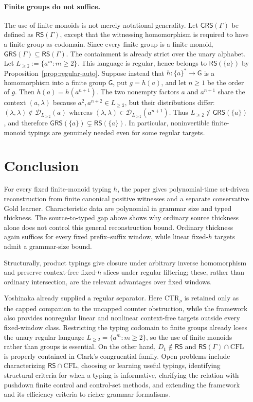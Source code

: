 \documentclass[11pt,a4paper]{article}
\theoremstyle{remark}
\theoremstyle{plain}
\newcommand{\D}{\mathcal{D}}
\begin{document}
\paragraph{Finite groups do not suffice.}
The use of finite monoids is not merely notational generality.  Let
$\mathsf{GRS}(\Gamma)$ be defined as $\mathsf{RS}(\Gamma)$, except that
the witnessing homomorphism is required to have a finite group as codomain.
Since every finite group is a finite monoid,
$\mathsf{GRS}(\Gamma)\subseteq\mathsf{RS}(\Gamma)$.
The containment is already strict over the unary alphabet.
Let
$L_{\ge2}:=\{a^m:m\ge2\}$.
This language is regular, hence belongs to $\mathsf{RS}(\{a\})$ by
Proposition~\ref{prop:regular-auto}.  Suppose instead that
$h:\{a\}^*\to\mathsf G$ is a homomorphism into a finite group
$\mathsf G$, put $g=h(a)$, and let $n\ge1$ be the order of $g$.  Then
$h(a)=h(a^{n+1})$.  The two nonempty factors $a$ and $a^{n+1}$ share the
context $(a,\lambda)$ because $a^2,a^{n+2}\in L_{\ge2}$, but their
distributions differ: $(\lambda,\lambda)\notin\D_{L_{\ge2}}(a)$ whereas
$(\lambda,\lambda)\in\D_{L_{\ge2}}(a^{n+1})$.
Thus $L_{\ge2}\notin\mathsf{GRS}(\{a\})$, and therefore
$\mathsf{GRS}(\{a\})\subsetneq\mathsf{RS}(\{a\})$.
In particular, noninvertible finite-monoid typings are genuinely needed even
for some regular targets.

\section{Conclusion}

For every fixed finite-monoid typing $h$, the paper gives polynomial-time
set-driven reconstruction from finite canonical positive witnesses and a
separate conservative Gold learner.  Characteristic data are polynomial in grammar size and typed thickness.  The
source-to-typed gap above shows why ordinary source thickness alone does not
control this general reconstruction bound.  Ordinary thickness again suffices
for every fixed prefix--suffix window, while linear fixed-$h$ targets admit a
grammar-size bound.

Structurally, product typings give closure under arbitrary inverse
homomorphism and preserve context-free fixed-$h$ slices under regular
filtering; these, rather than ordinary intersection, are the relevant
advantages over fixed windows.

Yoshinaka already supplied a regular separator.  Here $\mathrm{CTR}_\rho$
is retained only as the capped companion to the uncapped counter obstruction,
while the framework also provides nonregular linear and nonlinear
context-free targets outside every fixed-window class.  Restricting the typing codomain to finite groups already loses
the unary regular language $L_{\ge2}=\{a^m:m\ge2\}$, so the use of finite
monoids rather than groups is essential.  On the other hand,
$D_1\notin\mathsf{RS}$ and
$\mathsf{RS}(\Gamma)\cap\mathrm{CFL}$ is properly contained in Clark's
congruential family.  Open problems include characterizing
$\mathsf{RS}\cap\mathrm{CFL}$, choosing or learning useful typings,
identifying structural criteria for when a typing is informative, clarifying
the relation with pushdown finite control and control-set methods, and
extending the framework and its efficiency criteria to richer grammar
formalisms.
\end{document}
